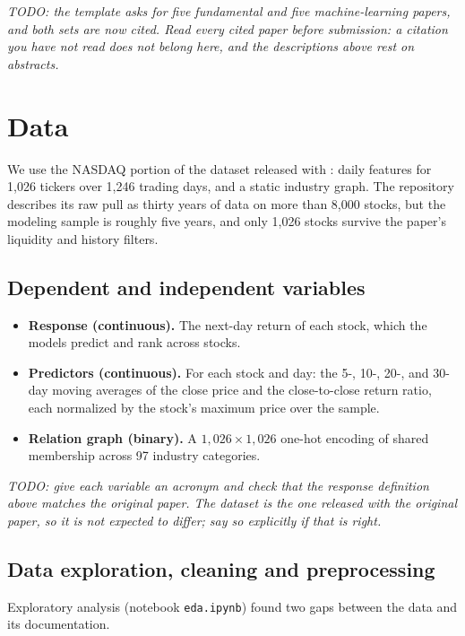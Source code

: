 \documentclass[12pt]{article}
\newcommand{\inst}[1]{\textit{#1}}
\begin{document}
\inst{TODO: the template asks for five fundamental and five machine-learning papers, and both
sets are now cited. Read every cited paper before submission: a citation you have not read does
not belong here, and the descriptions above rest on abstracts.}


\section{Data}
\label{sec:data}

We use the NASDAQ portion of the dataset released with \citet{feng2019temporal}: daily features
for 1{,}026 tickers over 1{,}246 trading days, and a static industry graph. The repository
describes its raw pull as thirty years of data on more than 8,000 stocks, but the modeling sample
is roughly five years, and only 1{,}026 stocks survive the paper's liquidity and history filters.

\subsection{Dependent and independent variables}

\begin{itemize}
  \item \textbf{Response (continuous).} The next-day return of each stock, which the models
  predict and rank across stocks.
  \item \textbf{Predictors (continuous).} For each stock and day: the 5-, 10-, 20-, and 30-day
  moving averages of the close price and the close-to-close return ratio, each normalized by the
  stock's maximum price over the sample.
  \item \textbf{Relation graph (binary).} A $1{,}026\times1{,}026$ one-hot encoding of shared
  membership across 97 industry categories.
\end{itemize}

\inst{TODO: give each variable an acronym and check that the response definition above matches
the original paper. The dataset is the one released with the original paper, so it is not
expected to differ; say so explicitly if that is right.}

\subsection{Data exploration, cleaning and preprocessing}

Exploratory analysis (notebook \texttt{eda.ipynb}) found two gaps between the data and its
documentation.
\end{document}
